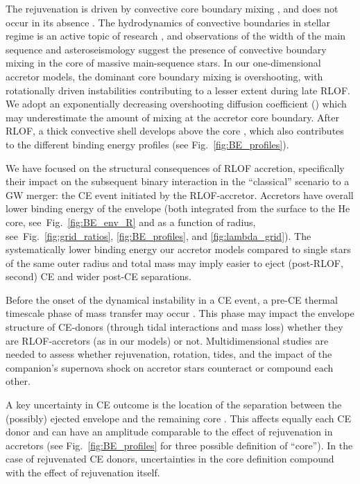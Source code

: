 \documentclass[twocolumn,twocolappendix,trackchanges]{aastex63}
\DeclareRobustCommand{\Figref}[1]{Fig.~\ref{#1}}
\begin{document}
The rejuvenation is driven by convective core boundary mixing
\citep[e.g.,][]{hellings:1983, hellings:1984, cantiello:2007,
  renzo:2021zoph}, and does not occur in its absence \citep{braun:95}.
The hydrodynamics of convective boundaries in stellar regime is an
active topic of research \citep[e.g.,][]{anders:22a, anders:22b}, and
observations of the width of the main sequence
\citep[e.g.,][]{brott:11} and asteroseismology
\citep[e.g.,][]{moravveji:16} suggest the presence of convective
boundary mixing in the core of massive main-sequence stars. In our
one-dimensional accretor models, the dominant core boundary mixing is
overshooting, with rotationally driven instabilities contributing to a
lesser extent during late RLOF. We adopt an exponentially decreasing
overshooting diffusion coefficient (\citealt{claret:17}) which may
underestimate the amount of mixing at the accretor core boundary.
After RLOF, a thick convective shell develops above the core
\citep[see][]{renzo:2021zoph}, which also contributes to the different
binding energy profiles (see \Figref{fig:BE_profiles}).

We have focused on the structural consequences of RLOF accretion,
specifically their impact on the subsequent binary interaction in the
``classical'' scenario to a GW merger: the CE event initiated by the
RLOF-accretor. Accretors have overall lower binding energy of the envelope
(both integrated from the surface to the He core,
see~\Figref{fig:BE_env_R} and as a function of radius,
see~\Figref{fig:grid_ratios}, \ref{fig:BE_profiles}, and \ref{fig:lambda_grid}). The
systematically lower binding energy our accretor models compared to
single stars of the same outer radius and total mass may
imply easier to eject (post-RLOF, second) CE and wider post-CE separations.

Before the onset of the dynamical instability in a CE event, a pre-CE
thermal timescale phase of mass transfer may occur
\citep[e.g.,][]{hjellming:1987, nandez:14, pejcha:17,
  blagorodnova:2021}. This phase may impact the envelope structure of
CE-donors (through tidal interactions and mass loss) whether they are
RLOF-accretors (as in our models) or not. Multidimensional studies are
needed to assess whether rejuvenation, rotation, tides, and the impact
of the companion's supernova shock on accretor stars counteract or
compound each other.

A key uncertainty in CE outcome is the location of the separation
between the (possibly) ejected envelope and the remaining core
\citep[e.g.,][]{tauris:01}. This affects equally each CE donor and
can have an amplitude comparable to the effect of rejuvenation in
accretors (see \Figref{fig:BE_profiles} for three possible definition
of ``core''). In the case of rejuvenated CE donors, uncertainties in the
core definition compound with the effect of rejuvenation itself.
\end{document}
